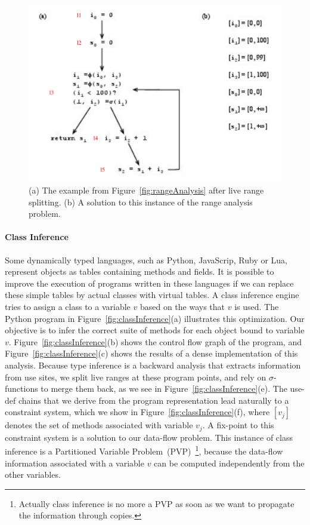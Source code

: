 \begin{figure}[t!]
\centering
\includegraphics[width=\linewidth]{RangeAnalysis-refs}
\caption{(a) The example from Figure~\ref{fig:rangeAnalysis} after live range splitting.
(b) A solution to this instance of the range analysis problem.}
\label{fig:rangeAnalysis-sparse}
\end{figure}



\paragraph{Class Inference} Some dynamically typed languages, such as Python, Java\-Scrip, Ruby or Lua, represent objects as tables containing methods and fields.
It is possible to improve the execution of programs written in these languages if we can replace these simple tables by actual classes with virtual tables.
A class inference engine tries to assign a class to a variable $v$ based on the ways that $v$ is used.
The Python program in Figure~\ref{fig:classInference}(a) illustrates this optimization.
Our objective is to infer the correct suite of methods for each object bound to variable $v$.
Figure~\ref{fig:classInference}(b) shows the control flow graph of the program, and Figure~\ref{fig:classInference}(c) shows the results of a dense implementation of this analysis.
Because type inference is a backward analysis that extracts information from use sites, we split live ranges at these program points, and rely on $\sigma$-functions to merge them back, as we see in Figure~\ref{fig:classInference}(e).
The use-def chains that we derive from the program representation lead naturally to a constraint system, which we show in Figure~\ref{fig:classInference}(f), where $[v_j]$ denotes the set of methods associated with variable $v_j$.
A fix-point to this constraint system is a solution to our data-flow problem.
This instance of class inference is a Partitioned Variable Problem~(PVP)~\footnote{Actually class inference is no more a PVP as soon as we want to propagate the information through copies.}, because the data-flow information associated with a variable $v$ can be computed independently from the other variables.

